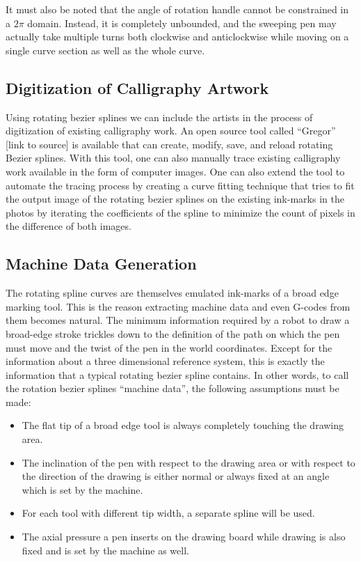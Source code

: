     It must also be noted that the angle of rotation handle cannot be constrained in a $2\pi$ domain. Instead, it is completely unbounded, and the sweeping pen may actually take multiple turns both clockwise and anticlockwise while moving on a single curve section as well as the whole curve.

    \subsection{Digitization of Calligraphy Artwork}
    Using rotating bezier splines we can include the artists in the process of digitization of existing calligraphy work. An open source tool called ``Gregor'' [link to source] is available that can create, modify, save, and reload rotating Bezier splines. With this tool, one can also manually trace existing calligraphy work available in the form of computer images. One can also extend the tool to automate the tracing process by creating a curve fitting technique that tries to fit the output image of the rotating bezier splines on the existing ink-marks in the photos by iterating the coefficients of the spline to minimize the count of pixels in the difference of both images.

    \subsection{Machine Data Generation}
    \label{ExplorationPoints1}
    The rotating spline curves are themselves emulated ink-marks of a broad edge marking tool. This is the reason extracting machine data and even G-codes from them becomes natural. The minimum information required by a robot to draw a broad-edge stroke trickles down to the definition of the path on which the pen must move and the twist of the pen in the world coordinates. Except for the information about a three dimensional reference system, this is exactly the information that a typical rotating bezier spline contains. In other words, to call the rotation bezier splines ``machine data'', the following assumptions must be made:

    \begin{itemize}
        \item The flat tip of a broad edge tool is always completely touching the drawing area.
    	\item The inclination of the pen with respect to the drawing area or with respect to the direction of the drawing is either normal or always fixed at an angle which is set by the machine.
    	\item For each tool with different tip width, a separate spline will be used.
    	\item The axial pressure a pen inserts on the drawing board while drawing is also fixed and is set by the machine as well.

    \end{itemize}

